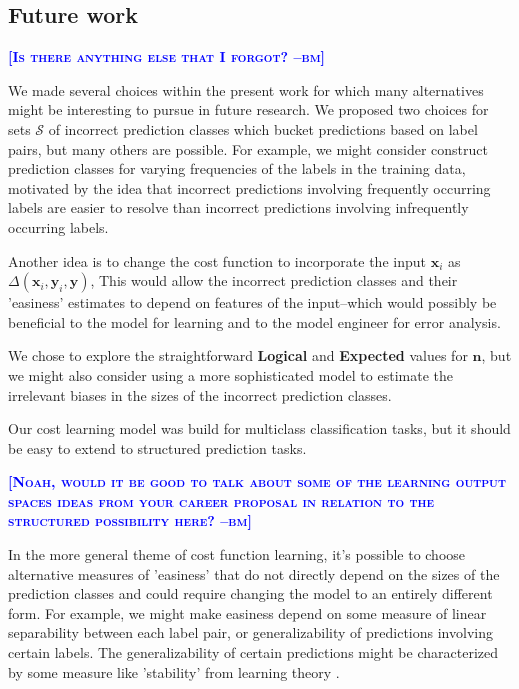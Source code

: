 \documentclass{article} %
\newcommand{\bmcomment}[1]{\textcolor{blue}{\textsc{\textbf{[#1 --bm]}}}}
\begin{document}
\subsection{Future work}

\bmcomment{Is there anything else that I forgot?}

We made several choices within the present work for which
many alternatives might be interesting to pursue in
future research.  We proposed two choices for 
sets $\mathcal{S}$ of incorrect prediction classes which 
bucket predictions based on label pairs, but many others
are possible. For example, we might consider construct
prediction classes for varying frequencies of the labels
in the training data, motivated by the idea that incorrect
predictions involving frequently occurring labels are easier
to resolve than incorrect predictions involving infrequently
occurring labels.  

Another idea is to change the cost function
to incorporate the input $\mathbf{x}_i$ as 
$\Delta(\mathbf{x}_i,\mathbf{y}_i,\mathbf{y})$, This would
allow the incorrect prediction classes and their 'easiness' 
estimates to depend on features of the input--which would
possibly be beneficial to the model for learning and to 
the model engineer for error analysis.

We chose to explore the straightforward \textbf{Logical} 
and \textbf{Expected} values for $\mathbf{n}$, but we might 
also consider using a more sophisticated model to estimate the 
irrelevant biases in the sizes of the incorrect prediction 
classes.

Our cost learning model was build for multiclass classification
tasks, but it should be easy to extend to structured prediction
tasks.

\bmcomment{Noah, would it be good to talk about some of the
learning output spaces ideas from your career proposal in 
relation to the structured possibility here?}

In the more general theme of cost function learning, it's possible
to choose alternative measures of 'easiness' that do not directly
depend on the sizes of the prediction classes and could require
changing the model to an entirely different form.  For example,
we might make easiness depend on some measure of linear separability
between each label pair, or generalizability of predictions involving
certain labels. The generalizability of certain predictions might 
be characterized by some measure like 'stability' from learning 
theory \citep{mukherjee2006learning}.
\end{document}
